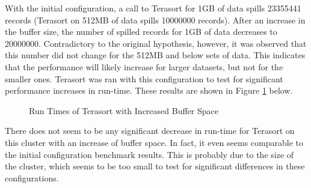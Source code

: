 \documentclass[10pt,journal,compsoc,float]{IEEEtran}
\begin{document}

With the initial configuration, a call to Terasort for 1GB of data spills 23355441 records (Terasort on 512MB of data spills 10000000 records). After an increase in the buffer size, the number of spilled records for 1GB of data decreases to 20000000. Contradictory to the original hypothesis, however, it was observed that this number did not change for the 512MB and below sets of data. This indicates that the performance will likely increase for larger datasets, but not for the smaller ones. Terasort was ran with this configuration to test for significant performance increases in run-time. These results are shown in Figure \ref{fig:TerasortSpill} below.

\sortdataSpill

\begin{figure}[H]
	\centering
	\caption{Run Times of Terasort with Increased Buffer Space}
	\label{fig:TerasortSpill}
\end{figure}

There does not seem to be any significant decrease in run-time for Terasort on this cluster with an increase of buffer space. In fact, it even seems comparable to the initial configuration benchmark results. This is probably due to the size of the cluster, which seems to be too small to test for significant differences in these configurations. 
\end{document}
